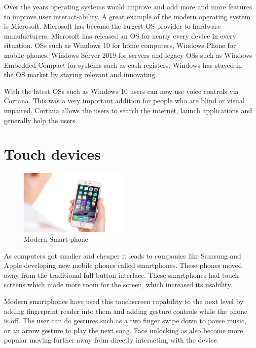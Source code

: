 Over the years operating systems would improve and add more and more features to improve user interact-ability. A great example of the modern operating system is Microsoft. Microsoft has become the largest OS provider to hardware manufacturers. Microsoft has released an OS for nearly every device in every situation. OSs such as Windows 10 for home computers, Windows Phone for mobile phones, Windows Server 2019 for servers and legacy OSs such as Windows Embedded Compact for systems such as cash registers. Windows has stayed in the OS market by staying relevant and innovating.

With the latest OSs such as Windows 10 users can now use voice controls via Cortana. This was a very important addition for people who are blind or visual impaired. Cortana allows the users to search the internet, launch applications and generally help the users.

\section{Touch devices}

\begin{figure}
  \begin{center}
    \includegraphics[width=0.48\textwidth]{img/smartphone.jpg}
  \end{center}
  \caption{Modern Smart phone}
\end{figure}

As computers got smaller and cheaper it leads to companies like Samsung and Apple developing new mobile phones called smartphones. These phones moved away from the traditional full button interface. These smartphones had touch screens which made more room for the screen, which increased its usability.

Modern smartphones have used this touchscreen capability to the next level by adding fingerprint reader into them and adding gesture controls while the phone is off. The user can do gestures such as a two finger swipe down to pause music, or an arrow gesture to play the next song. Face unlocking as also become more popular moving further away from directly interacting with the device.
